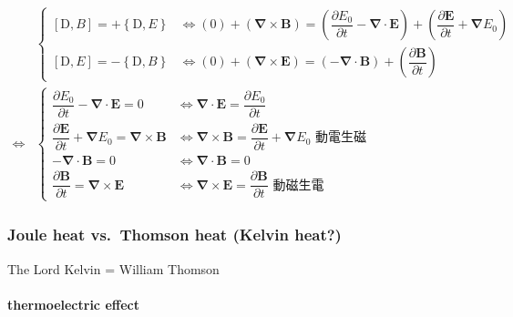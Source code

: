 \documentclass[
]{book}
\theoremstyle{definition}
\theoremstyle{definition}
\theoremstyle{definition}
\theoremstyle{definition}
\theoremstyle{remark}
\begin{document}
\begin{CJK}{UTF8}{bsmi}
$$
\begin{aligned}
 & \begin{cases}
\left[\mathrm{D},B\right]=+\left\{ \mathrm{D},E\right\}  & \Leftrightarrow\left(0\right)+\left(\boldsymbol{\nabla}\times\boldsymbol{B}\right)=\left(\dfrac{\partial E_{{\scriptscriptstyle 0}}}{\partial t}-\boldsymbol{\nabla}\cdot\boldsymbol{E}\right)+\left(\dfrac{\partial\boldsymbol{E}}{\partial t}+\boldsymbol{\nabla}E_{{\scriptscriptstyle 0}}\right)\\
\left[\mathrm{D},E\right]=-\left\{ \mathrm{D},B\right\}  & \Leftrightarrow\left(0\right)+\left(\boldsymbol{\nabla}\times\boldsymbol{E}\right)=\left(-\boldsymbol{\nabla}\cdot\boldsymbol{B}\right)+\left(\dfrac{\partial\boldsymbol{B}}{\partial t}\right)
\end{cases}\\
\Leftrightarrow & \begin{cases}
\dfrac{\partial E_{{\scriptscriptstyle 0}}}{\partial t}-\boldsymbol{\nabla}\cdot\boldsymbol{E}=0 & \Leftrightarrow\boldsymbol{\nabla}\cdot\boldsymbol{E}=\dfrac{\partial E_{{\scriptscriptstyle 0}}}{\partial t}\\
\dfrac{\partial\boldsymbol{E}}{\partial t}+\boldsymbol{\nabla}E_{{\scriptscriptstyle 0}}=\boldsymbol{\nabla}\times\boldsymbol{B} & \Leftrightarrow\boldsymbol{\nabla}\times\boldsymbol{B}=\dfrac{\partial\boldsymbol{E}}{\partial t}+\boldsymbol{\nabla}E_{{\scriptscriptstyle 0}}\text{ 動電生磁}\\
-\boldsymbol{\nabla}\cdot\boldsymbol{B}=0 & \Leftrightarrow\boldsymbol{\nabla}\cdot\boldsymbol{B}=0\\
\dfrac{\partial\boldsymbol{B}}{\partial t}=\boldsymbol{\nabla}\times\boldsymbol{E} & \Leftrightarrow\boldsymbol{\nabla}\times\boldsymbol{E}=\dfrac{\partial\boldsymbol{B}}{\partial t}\text{ 動磁生電}
\end{cases}
\end{aligned}
$$
\end{CJK}

\hypertarget{joule-heat-vs.-thomson-heat-kelvin-heat}{%
\subsubsection{Joule heat vs.~Thomson heat (Kelvin heat?)}\label{joule-heat-vs.-thomson-heat-kelvin-heat}}

The Lord Kelvin = William Thomson

\hypertarget{thermoelectric-effect}{%
\paragraph{thermoelectric effect}\label{thermoelectric-effect}}
\end{document}
